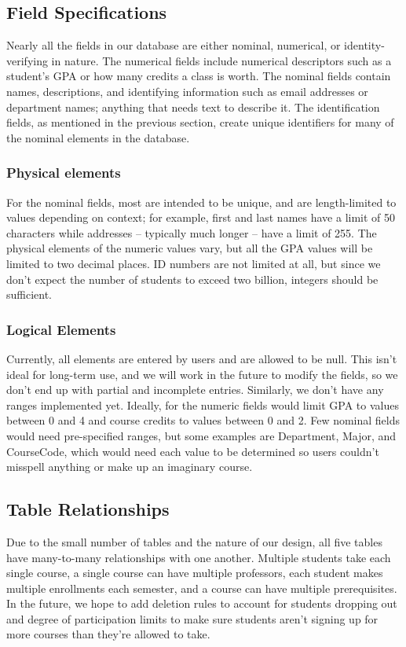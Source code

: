 \documentclass[12pt]{article}
\begin{document}
\subsection{Field Specifications}
Nearly all the fields in our database are either nominal, numerical, or identity-verifying in nature. The numerical fields include numerical descriptors such as a student’s GPA or how many credits a class is worth. The nominal fields contain names, descriptions, and identifying information such as email addresses or department names; anything that needs text to describe it. The identification fields, as mentioned in the previous section, create unique identifiers for many of the nominal elements in the database.

\subsubsection*{Physical elements}

For the nominal fields, most are intended to be unique, and are length-limited to values depending on context; for example, first and last names have a limit of 50 characters while addresses – typically much longer – have a limit of 255. The physical elements of the numeric values vary, but all the GPA values will be limited to two decimal places. ID numbers are not limited at all, but since we don’t expect the number of students to exceed two billion, integers should be sufficient.

\subsubsection*{Logical Elements}

Currently, all elements are entered by users and are allowed to be null. This isn’t ideal for long-term use, and we will work in the future to modify the fields, so we don’t end up with partial and incomplete entries. Similarly, we don’t have any ranges implemented yet. Ideally, for the numeric fields would limit GPA to values between 0 and 4 and course credits to values between 0 and 2. Few nominal fields would need pre-specified ranges, but some examples are Department, Major, and CourseCode, which would need each value to be determined so users couldn’t misspell anything or make up an imaginary course.

\subsection{Table Relationships}
Due to the small number of tables and the nature of our design, all five tables have many-to-many relationships with one another. Multiple students take each single course, a single course can have multiple professors, each student makes multiple enrollments each semester, and a course can have multiple prerequisites. In the future, we hope to add deletion rules to account for students dropping out and degree of participation limits to make sure students aren’t signing up for more courses than they’re allowed to take.
\end{document}

